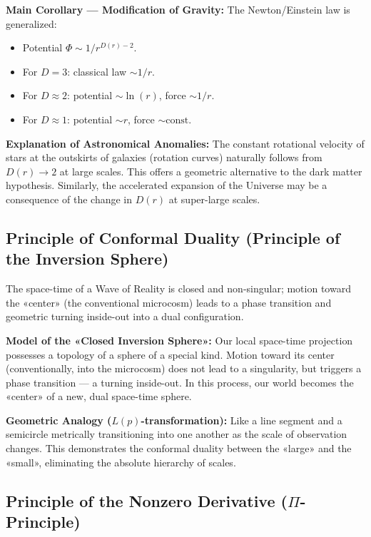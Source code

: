 \documentclass[a4paper,12pt]{article}
\begin{document}
	\textbf{Main Corollary — Modification of Gravity:} The Newton/Einstein law is generalized:
	\begin{itemize}
		\item Potential $\Phi \sim 1/r^{D(r)-2}$.
		\item For $D=3$: classical law $\sim 1/r$.
		\item For $D \approx 2$: potential $\sim \ln(r)$, force $\sim 1/r$.
		\item For $D \approx 1$: potential $\sim r$, force $\sim \text{const}$.
	\end{itemize}
	
	\textbf{Explanation of Astronomical Anomalies:} The constant rotational velocity of stars at the outskirts of galaxies (rotation curves) naturally follows from $D(r) \to 2$ at large scales. This offers a geometric alternative to the dark matter hypothesis. Similarly, the accelerated expansion of the Universe may be a consequence of the change in $D(r)$ at super-large scales.
	
	\subsection{Principle of Conformal Duality (Principle of the Inversion Sphere)}
	
	The space-time of a Wave of Reality is closed and non-singular; motion toward the «center» (the conventional microcosm) leads to a phase transition and geometric turning inside-out into a dual configuration.
	
	\textbf{Model of the «Closed Inversion Sphere»:} Our local space-time projection possesses a topology of a sphere of a special kind. Motion toward its center (conventionally, into the microcosm) does not lead to a singularity, but triggers a phase transition — a turning inside-out. In this process, our world becomes the «center» of a new, dual space-time sphere.
	
	\textbf{Geometric Analogy ($L(p)$-transformation):} Like a line segment and a semicircle metrically transitioning into one another as the scale of observation changes. This demonstrates the conformal duality between the «large» and the «small», eliminating the absolute hierarchy of scales.
	
	\subsection{Principle of the Nonzero Derivative ($\Pi$-Principle)}
	
\end{document}
